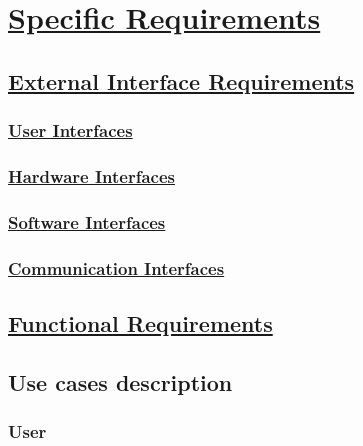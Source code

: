 \section[Specific Requirements]{\hyperlink{toc}{Specific Requirements}}

\subsection[External Interface Requirements]{\hyperlink{toc}{External Interface Requirements}}
	\label{sec:externalInterfaceRequirements}
	\subsubsection[User Interfaces]{\hyperlink{toc}{User Interfaces}}
	\subsubsection[Hardware Interfaces]{\hyperlink{toc}{Hardware Interfaces}}
	\subsubsection[Software Interfaces]{\hyperlink{toc}{Software Interfaces}}
	\subsubsection[Communication Interfaces]{\hyperlink{toc}{Communication Interfaces}}

\subsection[Functional Requirements]{\hyperlink{toc}{Functional Requirements}}

\subsection{Use cases description}
	\subsubsection{User}
	
